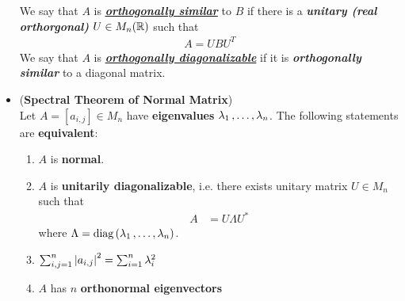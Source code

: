\documentclass[11pt]{article}
\begin{document}
\begin{itemize}
\begin{definition}
We say that $A$ is  \underline{\emph{\textbf{orthogonally similar}}} to $B$ if there is a \emph{\textbf{unitary (real orthorgonal)}} $U \in M_n({\mathbb R})$ such that
\begin{align*}
A = U B U^{T}
\end{align*} We say that $A$ is \underline{\emph{\textbf{orthogonally diagonalizable}}} if it is \textbf{\emph{orthogonally similar}} to a diagonal matrix.

\end{definition}

%

\item \begin{theorem} (\textbf{Spectral Theorem of Normal Matrix})   \citep{horn2012matrix}\\
Let $A = [a_{i,j}] \in M_n$ have \textbf{eigenvalues} $\lambda_1 \,{,}\ldots{,}\, \lambda_n$. The following statements are \textbf{equivalent}:
\begin{enumerate}
\item $A$ is \textbf{normal}.
\item $A$ is \textbf{unitarily diagonalizable}, i.e. there exists unitary matrix $U \in M_n$ such that 
\begin{align*}
A &= U \Lambda U^{*}
\end{align*} where $\Lambda = \text{diag}\left(\lambda_1 \,{,}\ldots{,}\, \lambda_n\right)$.
\item $\sum_{i,j=1}^{n}\left\lvert a_{i,j} \right\rvert^2 = \sum_{i=1}^{n}\lambda_i^2$
\item $A$ has $n$ \textbf{orthonormal eigenvectors}
\end{enumerate}
\end{theorem}



\end{itemize}
\end{document}

